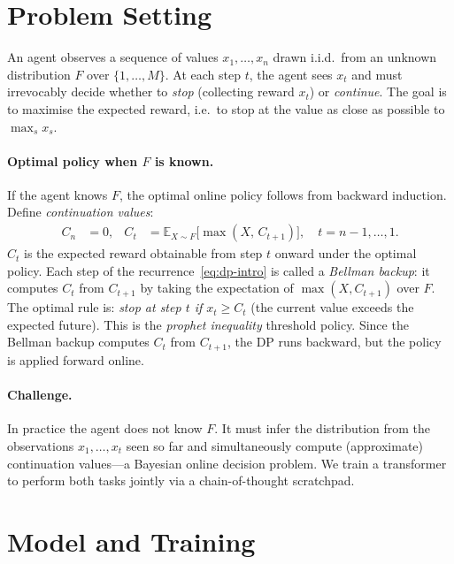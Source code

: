
\section{Problem Setting}
\label{sec:problem}

An agent observes a sequence of values $x_1, \ldots, x_n$ drawn i.i.d.\ from an unknown distribution $F$ over $\{1, \ldots, M\}$. At each step $t$, the agent sees $x_t$ and must irrevocably decide whether to \emph{stop} (collecting reward $x_t$) or \emph{continue}. The goal is to maximise the expected reward, i.e.\ to stop at the value as close as possible to $\max_s x_s$.

\paragraph{Optimal policy when $F$ is known.}
If the agent knows $F$, the optimal online policy follows from backward induction. Define \emph{continuation values}:
\begin{align}
C_n &= 0, & C_t &= \mathbb{E}_{X \sim F}\!\big[\max(X,\, C_{t+1})\big], \quad t = n{-}1, \ldots, 1. \label{eq:dp-intro}
\end{align}
$C_t$ is the expected reward obtainable from step $t$ onward under the optimal policy. Each step of the recurrence~\eqref{eq:dp-intro} is called a \emph{Bellman backup}: it computes $C_t$ from $C_{t+1}$ by taking the expectation of $\max(X, C_{t+1})$ over $F$. The optimal rule is: \emph{stop at step $t$ if $x_t \ge C_t$} (the current value exceeds the expected future). This is the \emph{prophet inequality} threshold policy. Since the Bellman backup computes $C_t$ from $C_{t+1}$, the DP runs backward, but the policy is applied forward online.

\paragraph{Challenge.}
In practice the agent does not know $F$. It must infer the distribution from the observations $x_1, \ldots, x_t$ seen so far and simultaneously compute (approximate) continuation values---a Bayesian online decision problem. We train a transformer to perform both tasks jointly via a chain-of-thought scratchpad.

\section{Model and Training}
\label{sec:model}

